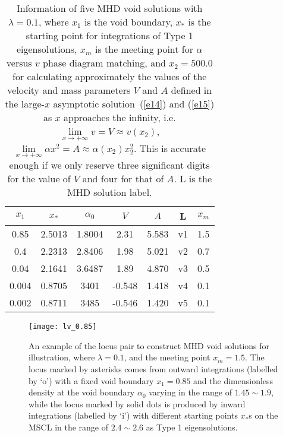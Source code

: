 \documentclass[fleqn,usenatbib]{mnras}
\begin{document}
\begin{table}
  \centering
  \caption{Information of five MHD void solutions with $\lambda=0.1$, where $x_{1}$ is the void boundary, $x_{*}$ is the starting point for integrations of Type 1 eigensolutions, $x_{m}$ is the meeting point for $\alpha$ versus $v$ phase diagram matching, and $x_{2}=500.0$ for calculating approximately the values of the velocity and mass parameters $V$ and $A$ defined in the large-$x$ asymptotic solution~(\ref{e14}) and (\ref{e15}) as $x$ approaches the infinity, i.e. $\lim\limits_{x\rightarrow +\infty} v=V\approx v(x_{2})$, $\lim\limits_{x\rightarrow +\infty}\alpha x^{2}=A\approx \alpha(x_{2})x_{2}^{2}$. This is accurate enough if we only reserve three significant digits for the value of $V$ and four for that of $A$. L is the MHD solution label.}
    \begin{tabular}{ccccccc}
    \hline
    $x_{1}$ & $x_{*}$ & $\alpha_{0}$ & $V$ & $A$ & L & $x_{m}$\\
    \hline
    0.85 & 2.5013 & 1.8004 & 2.31 & 5.583 & v1 & 1.5\\
    0.4 & 2.2313 & 2.8406 & 1.98 & 5.021 & v2 & 0.7\\
    0.04 & 2.1641 & 3.6487 & 1.89 & 4.870 & v3 & 0.5\\
    0.004 & 0.8705 & 3401 & -0.548 & 1.418 & v4 & 0.1\\
    0.002 & 0.8711 & 3485 & -0.546 & 1.420 & v5 & 0.1\\
    \hline
    \end{tabular}
    \label{t1}
\end{table}    

\begin{figure}
\centering
\texttt{[image: lv\_0.85]}
\caption{
An example of the locus pair to construct MHD void solutions for illustration, where $\lambda=0.1$, and the meeting point $x_{m}=1.5$. The locus marked by asterisks comes from outward integrations (labelled by `o') with a fixed void boundary $x_{1}=0.85$ and the dimensionless density at the void boundary $\alpha_{0}$ varying in the range of $1.45\sim 1.9$, while the locus marked by solid dots is produced by inward integrations (labelled by `i') with different starting points $x_{*}$s on the MSCL in the range of $2.4\sim 2.6$ as Type 1 eigensolutions.
 }
\label{1}
\end{figure}
\end{document}
